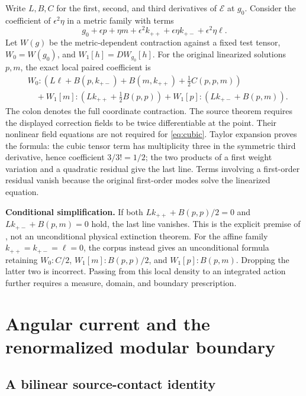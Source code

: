 Write \(L,B,C\) for the first, second, and third derivatives of \(\mathcal E\) at \(g_0\). Consider the coefficient of \(\epsilon^2\eta\) in a metric family with terms
\[
 g_0+\epsilon p+\eta m+\epsilon^2k_{++}
       +\epsilon\eta k_{+-}+\epsilon^2\eta\ell.
\]
Let \(W(g)\) be the metric-dependent contraction against a fixed test tensor, \(W_0=W(g_0)\), and \(W_1[h]=DW_{g_0}[h]\). For the original linearized solutions \(p,m\), the exact local paired coefficient is
\begin{align}\label{eq:cubic}
 &W_0\!:\!\left(L\ell+B(p,k_{+-})+B(m,k_{++})+\tfrac12C(p,p,m)\right)\nonumber\\
 &\quad+W_1[m]\!:\!\left(Lk_{++}+\tfrac12B(p,p)\right)
       +W_1[p]\!:\!\left(Lk_{+-}+B(p,m)\right).
\end{align}
The colon denotes the full coordinate contraction. The source theorem requires the displayed correction fields to be twice differentiable at the point. Their nonlinear field equations are not required for \eqref{eq:cubic}.
Taylor expansion proves the formula: the cubic tensor term has multiplicity three in the symmetric third derivative, hence coefficient \(3/3!=1/2\); the two products of a first weight variation and a quadratic residual give the last line. Terms involving a first-order residual vanish because the original first-order modes solve the linearized equation.

\textbf{Conditional simplification.} If both \(Lk_{++}+B(p,p)/2=0\) and \(Lk_{+-}+B(p,m)=0\) hold, the last line vanishes. This is the explicit premise of , not an unconditional physical extinction theorem.
For the affine family \(k_{++}=k_{+-}=\ell=0\), the corpus instead gives an unconditional formula retaining \(W_0:C/2\), \(W_1[m]:B(p,p)/2\), and \(W_1[p]:B(p,m)\). Dropping the latter two is incorrect. Passing from this local density to an integrated action further requires a measure, domain, and boundary prescription.

\section{Angular current and the renormalized modular boundary}

\subsection{A bilinear source-contact identity}

